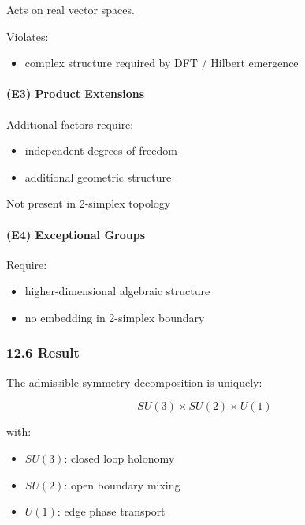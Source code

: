 \documentclass[
]{article}
\providecommand{\tightlist}{%
  \setlength{\itemsep}{0pt}\setlength{\parskip}{0pt}}
\begin{document}
Acts on real vector spaces.

Violates:

\begin{itemize}
\tightlist
\item
  complex structure required by DFT / Hilbert emergence
\end{itemize}

\paragraph{(E3) Product Extensions}\label{e3-product-extensions}

Additional factors require:

\begin{itemize}
\tightlist
\item
  independent degrees of freedom
\item
  additional geometric structure
\end{itemize}

Not present in 2-simplex topology

\paragraph{(E4) Exceptional Groups}\label{e4-exceptional-groups}

Require:

\begin{itemize}
\tightlist
\item
  higher-dimensional algebraic structure
\item
  no embedding in 2-simplex boundary
\end{itemize}

\subsubsection{12.6 Result}\label{result-1}

The admissible symmetry decomposition is uniquely:

\[
SU(3) \times SU(2) \times U(1)
\]

with:

\begin{itemize}
\tightlist
\item
  \(SU(3)\): closed loop holonomy
\item
  \(SU(2)\): open boundary mixing
\item
  \(U(1)\): edge phase transport
\end{itemize}
\end{document}
